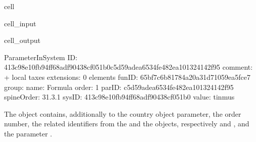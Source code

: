 \documentclass[letterpaper,10pt,english]{sphinxmanual}
\begin{document}
\begin{sphinxuseclass}{cell}
\begin{sphinxuseclass}{cell_input}
\begin{sphinxVerbatim}[commandchars=\\\{\}]
\PYG{p}{[}\PYG{p}{]}\PYG{p}{[}\PYG{p}{]}\PYG{p}{[}\PYG{p}{]}\PYG{p}{[}\PYG{p}{]}\PYG{p}{[}\PYG{p}{]} 
\end{sphinxVerbatim}

\end{sphinxuseclass}
\begin{sphinxuseclass}{cell_output}
\begin{sphinxVerbatim}[commandchars=\\\{\}]
\PYGZhy{}\PYGZhy{}\PYGZhy{}\PYGZhy{}\PYGZhy{}\PYGZhy{}\PYGZhy{}\PYGZhy{}\PYGZhy{}\PYGZhy{}\PYGZhy{}\PYGZhy{}\PYGZhy{}\PYGZhy{}\PYGZhy{}\PYGZhy{}\PYGZhy{}\PYGZhy{}\PYGZhy{}\PYGZhy{}\PYGZhy{}\PYGZhy{}\PYGZhy{}\PYGZhy{}\PYGZhy{}\PYGZhy{}\PYGZhy{}\PYGZhy{}\PYGZhy{}\PYGZhy{}
ParameterInSystem
\PYGZhy{}\PYGZhy{}\PYGZhy{}\PYGZhy{}\PYGZhy{}\PYGZhy{}\PYGZhy{}\PYGZhy{}\PYGZhy{}\PYGZhy{}\PYGZhy{}\PYGZhy{}\PYGZhy{}\PYGZhy{}\PYGZhy{}\PYGZhy{}\PYGZhy{}\PYGZhy{}\PYGZhy{}\PYGZhy{}\PYGZhy{}\PYGZhy{}\PYGZhy{}\PYGZhy{}\PYGZhy{}\PYGZhy{}\PYGZhy{}\PYGZhy{}\PYGZhy{}\PYGZhy{}
	 ID: \PYGZsq{}413c98e1\PYGZhy{}0fb9\PYGZhy{}4ff6\PYGZhy{}8adf\PYGZhy{}90438cf051b0c5d59ade\PYGZhy{}a653\PYGZhy{}4fe4\PYGZhy{}82ea\PYGZhy{}101324142f95\PYGZsq{}
	 comment: \PYGZsq{}+ local taxes\PYGZsq{}
	 extensions: 0 elements
	 funID: \PYGZsq{}65bf7c6b\PYGZhy{}8178\PYGZhy{}4a20\PYGZhy{}a31d\PYGZhy{}71059ea5fce7\PYGZsq{}
	 group: \PYGZsq{}\PYGZsq{}
	 name: \PYGZsq{}Formula\PYGZsq{}
	 order: \PYGZsq{}1\PYGZsq{}
	 parID: \PYGZsq{}c5d59ade\PYGZhy{}a653\PYGZhy{}4fe4\PYGZhy{}82ea\PYGZhy{}101324142f95\PYGZsq{}
	 spineOrder: \PYGZsq{}31.3.1\PYGZsq{}
	 sysID: \PYGZsq{}413c98e1\PYGZhy{}0fb9\PYGZhy{}4ff6\PYGZhy{}8adf\PYGZhy{}90438cf051b0\PYGZsq{}
	 value: \PYGZsq{}tinmu\PYGZus{}s\PYGZsq{}
\end{sphinxVerbatim}

\end{sphinxuseclass}
\end{sphinxuseclass}
\sphinxAtStartPar
The  object contains, additionally to the country object parameter, the order number, the related identifiers from the  and the  objects, respectively  and , and the parameter .
\end{document}
